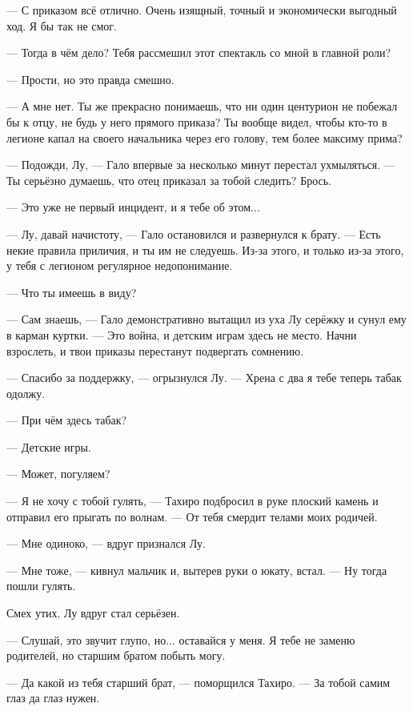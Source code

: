--- С приказом всё отлично.
Очень изящный, точный и экономически выгодный ход.
Я бы так не смог.

--- Тогда в чём дело?
Тебя рассмешил этот спектакль со мной в главной роли?

--- Прости, но это правда смешно.

--- А мне нет.
Ты же прекрасно понимаешь, что ни один центурион не побежал бы к отцу, не будь у него прямого приказа?
Ты вообще видел, чтобы кто-то в легионе капал на своего начальника через его голову, тем более максиму прима?

--- Подожди, Лу, --- Гало впервые за несколько минут перестал ухмыляться.
--- Ты серьёзно думаешь, что отец приказал за тобой следить?
Брось.

--- Это уже не первый инцидент, и я тебе об этом...

--- Лу, давай начистоту, --- Гало остановился и развернулся к брату.
--- Есть некие правила приличия, и ты им не следуешь.
Из-за этого, и только из-за этого, у тебя с легионом регулярное недопонимание.

--- Что ты имеешь в виду?

--- Сам знаешь, --- Гало демонстративно вытащил из уха Лу серёжку и сунул ему в карман куртки.
--- Это война, и детским играм здесь не место.
Начни взрослеть, и твои приказы перестанут подвергать сомнению.

--- Спасибо за поддержку, --- огрызнулся Лу.
--- Хрена с два я тебе теперь табак одолжу.

--- При чём здесь табак?

--- Детские игры.

\asterism

--- Может, погуляем?

--- Я не хочу с тобой гулять, --- Тахиро подбросил в руке плоский камень и отправил его прыгать по волнам.
--- От тебя смердит телами моих родичей.

--- Мне одиноко, --- вдруг признался Лу.

--- Мне тоже, --- кивнул мальчик и, вытерев руки о юкату, встал.
--- Ну тогда пошли гулять.

\asterism

Смех утих.
Лу вдруг стал серьёзен.

--- Слушай, это звучит глупо, но... оставайся у меня.
Я тебе не заменю родителей, но старшим братом побыть могу.

--- Да какой из тебя старший брат, --- поморщился Тахиро.
--- За тобой самим глаз да глаз нужен.

